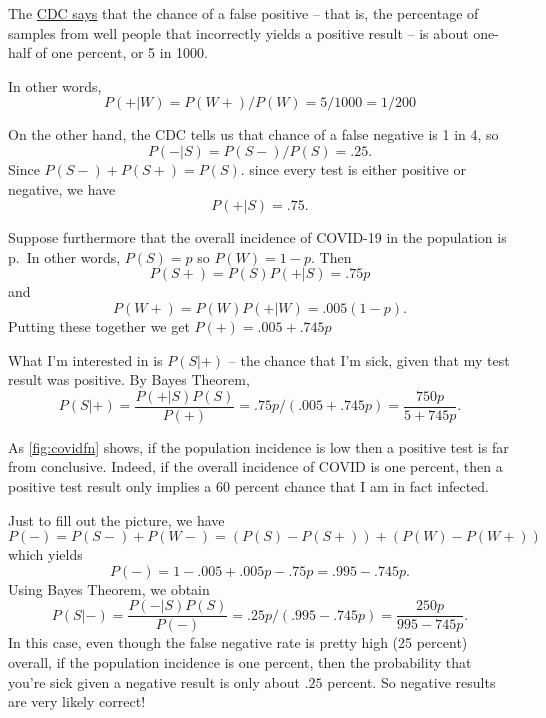 \documentclass[
  oneside]{scrbook}
\begin{document}
The
\href{https://www.icd10monitor.com/false-positives-in-pcr-tests-for-covid-19}{CDC
says} that the chance of a false positive -- that is, the percentage of
samples from well people that incorrectly yields a positive result -- is
about one-half of one percent, or 5 in 1000.

In other words, \[
P(+|W) = P(W+)/P(W) = 5/1000=1/200
\]

On the other hand, the CDC tells us that chance of a false negative is 1
in 4, so \[
P(-|S) = P(S-)/P(S) = .25.
\] Since \(P(S-)+P(S+)=P(S).\) since every test is either positive or
negative, we have \[
P(+|S) = .75.
\]

Suppose furthermore that the overall incidence of COVID-19 in the
population is p.~In other words, \(P(S)=p\) so \(P(W)=1-p\). Then
\[P(S+)=P(S)P(+|S)=.75p\] and \[
P(W+)=P(W)P(+|W)=.005(1-p).
\] Putting these together we get \(P(+)=.005+.745p\)

What I'm interested in is \(P(S|+)\) -- the chance that I'm sick, given
that my test result was positive. By Bayes Theorem, \[
P(S|+)=\frac{P(+|S)P(S)}{P(+)}=.75p/(.005+.745p)=\frac{750p}{5+745p}.
\]

As \cref{fig:covidfn} shows, if the population incidence is low then a
positive test is far from conclusive. Indeed, if the overall incidence
of COVID is one percent, then a positive test result only implies a 60
percent chance that I am in fact infected.

Just to fill out the picture, we have \[
P(-) = P(S-)+P(W-)=(P(S)-P(S+))+(P(W)-P(W+))
\] which yields \[
P(-)=1-.005+.005p-.75p = .995-.745p.
\] Using Bayes Theorem, we obtain \[
P(S|-) = \frac{P(-|S)P(S)}{P(-)} = .25p/(.995-.745p) =\frac{250p}{995-745p}.
\] In this case, even though the false negative rate is pretty high (25
percent) overall, if the population incidence is one percent, then the
probability that you're sick given a negative result is only about
\(.25\) percent. So negative results are very likely correct!
\end{document}

